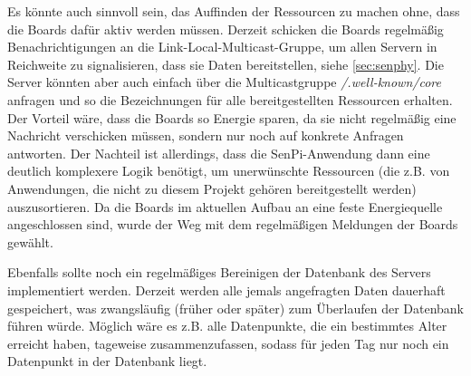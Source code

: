 \documentclass[a4paper]{article}
\begin{document}
Es könnte auch sinnvoll sein, das Auffinden der Ressourcen zu machen ohne, dass die Boards dafür aktiv werden müssen. Derzeit schicken die Boards regelmäßig Benachrichtigungen an die Link-Local-Multicast-Gruppe, um allen Servern in Reichweite zu signalisieren, dass sie Daten bereitstellen, siehe \ref{sec:senphy}. Die Server könnten aber auch einfach über die Multicastgruppe \emph{/.well-known/core} anfragen und so die Bezeichnungen für alle bereitgestellten Ressourcen erhalten. Der Vorteil wäre, dass die Boards so Energie sparen, da sie nicht regelmäßig eine Nachricht verschicken müssen, sondern nur noch auf konkrete Anfragen antworten. Der Nachteil ist allerdings, dass die SenPi-Anwendung dann eine deutlich komplexere Logik benötigt, um unerwünschte Ressourcen (die z.B. von Anwendungen, die nicht zu diesem Projekt gehören bereitgestellt werden) auszusortieren. Da die Boards im aktuellen Aufbau an eine feste Energiequelle angeschlossen sind, wurde der Weg mit dem regelmäßigen Meldungen der Boards gewählt.

Ebenfalls sollte noch ein regelmäßiges Bereinigen der Datenbank des Servers implementiert werden. Derzeit werden alle jemals angefragten Daten dauerhaft gespeichert, was zwangsläufig (früher oder später) zum Überlaufen der Datenbank führen würde. Möglich wäre es z.B. alle Datenpunkte, die ein bestimmtes Alter erreicht haben, tageweise zusammenzufassen, sodass für jeden Tag nur noch ein Datenpunkt in der Datenbank liegt.
\end{document}
